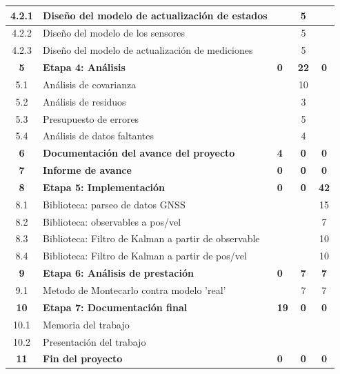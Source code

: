 \documentclass[11pt]{charter}
\begin{document}
\begin{table}[H]
\begin{tabularx}{\linewidth}{@{}|c|X|>{\centering}m{2cm}|c|c|@{}}
4.2.1		& Diseño del modelo de actualización de estados		& 	 			& 5 			&   \\ \hline
4.2.2		& Diseño del modelo de los sensores 					& 	 			& 5 			& 	\\ \hline
4.2.3		& Diseño del modelo de actualización de mediciones	& 	 			& 5 			& 	\\ \hline
\rowcolor{lightgray!50}
\textbf{5}	& \textbf{Etapa 4: Análisis}							& \textbf{0}	& \textbf{22}	& \textbf{0} \\ \hline
5.1			& Análisis de covarianza								& 	 			& 10 			& 	\\ \hline
5.2			& Análisis de residuos 									& 	 			& 3 			& 	\\ \hline
5.3			& Presupuesto de errores								& 	 			& 5 			& 	\\ \hline
5.4			& Análisis de datos faltantes							& 	 			& 4 			& 	\\ \hline
\rowcolor{lightgray!50}
\textbf{6}	& \textbf{Documentación del avance del proyecto} 		& \textbf{4}	& \textbf{0}	& \textbf{0} \\ \hline
\rowcolor{lightgray!50}
\textbf{7} 	& \textbf{Informe de avance} 							& \textbf{0} 	& \textbf{0}	& \textbf{0} \\ \hline
\rowcolor{lightgray!50}
\textbf{8}	& \textbf{Etapa 5: Implementación}						& \textbf{0} 	& \textbf{0} 	& \textbf{42}\\ \hline
8.1			& Biblioteca: parseo de datos GNSS						& 	 			& 	 			& 15\\ \hline
8.2			& Biblioteca: observables a pos/vel					& 	 			& 	 			& 7 \\ \hline
8.3			& Biblioteca: Filtro de Kalman a partir de observable & 	 			& 	 			& 10\\ \hline
8.4			& Biblioteca: Filtro de Kalman a partir de pos/vel 	& 	 			& 	 			& 10\\ \hline
\rowcolor{lightgray!50}
\textbf{9} 	& \textbf{Etapa 6: Análisis de prestación}				& \textbf{0}	& \textbf{7} 	& \textbf{7} \\ \hline
9.1			& Metodo de Montecarlo contra modelo 'real' 			& 	 			& 7 			& 7 \\ \hline
\rowcolor{lightgray!50}
\textbf{10}	& \textbf{Etapa 7: Documentación final}				& \textbf{19} 	& \textbf{0} 	& \textbf{0} \\ \hline
10.1 		& Memoria del trabajo		 							& 15 			& 	 			& 	\\ \hline
10.2 		& Presentación del trabajo		 						& 4 			& 	 			& 	\\ \hline
\rowcolor{lightgray!50}
\textbf{11}	& \textbf{Fin del proyecto} 							& \textbf{0} 	& \textbf{0}	& \textbf{0} \\ \hline
\end{tabularx}%
\end{table}
\end{document}
